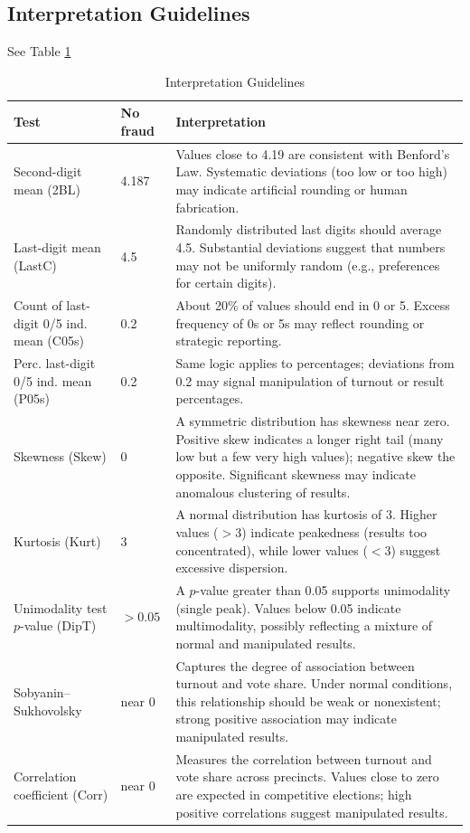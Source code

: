 \documentclass{article}
\begin{document}
\subsection{Interpretation Guidelines}

See Table \ref{tab:interpret}
\begin{table}[ht]
\centering
\footnotesize
\caption{Interpretation Guidelines} \label{tab:interpret}
\begin{tabularx}{\textwidth}{l l X}
\toprule
\textbf{Test} & \textbf{No fraud} & \textbf{Interpretation} \\
\midrule
Second-digit mean (2BL) & 4.187 & 
Values close to 4.19 are consistent with Benford's Law. Systematic deviations (too low or too high) may indicate artificial rounding or human fabrication. \\

Last-digit mean (LastC) & 4.5 & 
Randomly distributed last digits should average 4.5. Substantial deviations suggest that numbers may not be uniformly random (e.g., preferences for certain digits). \\

Count of last-digit 0/5 ind. mean (C05s) & 0.2 & 
About 20\% of values should end in 0 or 5. Excess frequency of 0s or 5s may reflect rounding or strategic reporting. \\

Perc. last-digit 0/5 ind. mean (P05s) & 0.2 & 
Same logic applies to percentages; deviations from 0.2 may signal manipulation of turnout or result percentages. \\

Skewness (Skew) & 0 & 
A symmetric distribution has skewness near zero. Positive skew indicates a longer right tail (many low but a few very high values); negative skew the opposite. Significant skewness may indicate anomalous clustering of results. \\

Kurtosis (Kurt) & 3 & 
A normal distribution has kurtosis of 3. Higher values ($>3$) indicate peakedness (results too concentrated), while lower values ($<3$) suggest excessive dispersion.\\

Unimodality test $p$-value (DipT) & $>0.05$ & 
A $p$-value greater than 0.05 supports unimodality (single peak). Values below 0.05 indicate multimodality, possibly reflecting a mixture of normal and manipulated results. \\

Sobyanin--Sukhovolsky  & near 0 & 
Captures the degree of association between turnout and vote share. Under normal conditions, this relationship should be weak or nonexistent; strong positive association may indicate manipulated results. \\

Correlation coefficient (Corr) & near 0 & 
Measures the correlation between turnout and vote share across precincts. Values close to zero are expected in competitive elections; high positive correlations suggest manipulated results. \\
\bottomrule
\end{tabularx}
\end{table}
\end{document}
